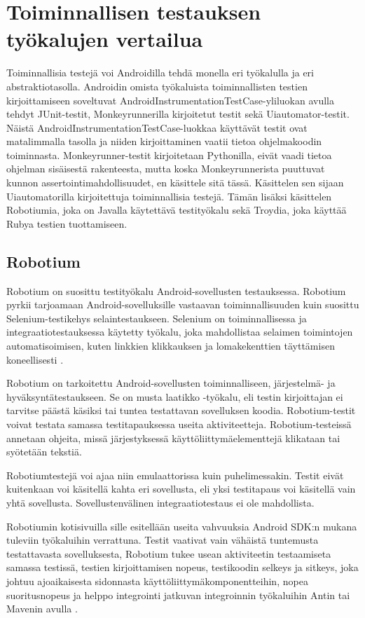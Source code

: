 \section{Toiminnallisen testauksen työkalujen vertailua}

Toiminnallisia testejä voi Androidilla tehdä monella eri työkalulla ja eri abstraktiotasolla. Androidin omista työkaluista toiminnallisten testien kirjoittamiseen soveltuvat AndroidInstrumentationTestCase-yliluokan avulla tehdyt JUnit-testit, Monkeyrunnerilla kirjoitetut testit sekä Uiautomator-testit. Näistä AndroidInstrumentationTestCase-luokkaa käyttävät testit ovat matalimmalla tasolla ja niiden kirjoittaminen vaatii tietoa ohjelmakoodin toiminnasta. Monkeyrunner-testit kirjoitetaan Pythonilla, eivät vaadi tietoa ohjelman sisäisestä rakenteesta, mutta koska Monkeyrunnerista puuttuvat kunnon assertointimahdollisuudet, en käsittele sitä tässä. Käsittelen sen sijaan Uiautomatorilla kirjoitettuja toiminnallisia testejä. Tämän lisäksi käsittelen Robotiumia, joka on Javalla käytettävä testityökalu sekä Troydia, joka käyttää Rubya testien tuottamiseen.

\subsection{Robotium}

Robotium on suosittu testityökalu Android-sovellusten testauksessa. Robotium pyrkii tarjoamaan Android-sovelluksille vastaavan toiminnallisuuden kuin suosittu Selenium-testikehys selaintestaukseen. Selenium on toiminnallisessa ja integraatiotestauksessa käytetty työkalu, joka mahdollistaa selaimen toimintojen automatisoimisen, kuten linkkien klikkauksen ja lomakekenttien täyttämisen koneellisesti \cite{selenium}.

Robotium on tarkoitettu Android-sovellusten toiminnalliseen, järjestelmä- ja hyväksyntätestaukseen. Se on musta laatikko -työkalu, eli testin kirjoittajan ei tarvitse päästä käsiksi tai tuntea testattavan sovelluksen koodia. Robotium-testit voivat testata samassa testitapauksessa useita aktiviteetteja. Robotium-testeissä annetaan ohjeita, missä järjestyksessä käyttöliittymäelementtejä klikataan tai syötetään tekstiä.

Robotiumtestejä voi ajaa niin emulaattorissa kuin puhelimessakin. Testit eivät kuitenkaan voi käsitellä kahta eri sovellusta, eli yksi testitapaus voi käsitellä vain yhtä sovellusta. Sovellustenvälinen integraatiotestaus ei ole mahdollista.

Robotiumin kotisivuilla sille esitellään useita vahvuuksia Android SDK:n mukana tuleviin työkaluihin verrattuna. Testit vaativat vain vähäistä tuntemusta testattavasta sovelluksesta, Robotium tukee usean aktiviteetin testaamiseta samassa testissä, testien kirjoittamisen nopeus, testikoodin selkeys ja sitkeys, joka johtuu ajoaikaisesta sidonnasta käyttöliittymäkomponentteihin, nopea suoritusnopeus ja helppo integrointi jatkuvan integroinnin työkaluihin Antin tai Mavenin avulla \cite{robotium}.

